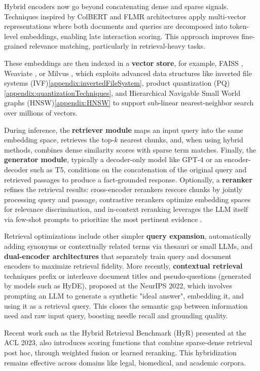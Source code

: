 \documentclass[12pt,twoside]{report}
\begin{document}
Hybrid encoders now go beyond concatenating dense and sparse signals. Techniques inspired by ColBERT and FLMR architectures apply multi-vector representations where both documents and queries are decomposed into token-level embeddings, enabling late interaction scoring\cite{ColBERT}. This approach improves fine-grained relevance matching, particularly in retrieval-heavy tasks.

These embeddings are then indexed in a \textbf{vector store}, for example, FAISS \cite{FAISS}, Weaviate \cite{Weaviate}, or Milvus \cite{Milvus}, which exploits advanced data structures like inverted file systems (IVF)\ref{appendix:invertedFileSystem}, product quantization (PQ)\ref{appendix:quantizationTechniques}, and Hierarchical Navigable Small World graphs (HNSW)\ref{appendix:HNSW} to support sub-linear nearest-neighbor search over millions of vectors.

During inference, the \textbf{retriever module} maps an input query into the same embedding space, retrieves the top-$k$ nearest chunks, and, when using hybrid methods, combines dense similarity scores with sparse term matches. Finally, the \textbf{generator module}, typically a decoder-only model like GPT-4 or an encoder-decoder such as T5, conditions on the concatenation of the original query and retrieved passages to produce a fact-grounded response. Optionally, a \textbf{reranker} refines the retrieval results: cross-encoder rerankers rescore chunks by jointly processing query and passage, contrastive rerankers optimize embedding spaces for relevance discrimination, and in-context reranking leverages the LLM itself via few-shot prompts to prioritize the most pertinent evidence \cite{Reranking}.

Retrieval optimizations include other simpler \textbf{query expansion}, automatically adding synonyms or contextually related terms via thesauri or small LLMs, and \textbf{dual-encoder architectures} that separately train query and document encoders to maximize retrieval fidelity. More recently, \textbf{contextual retrieval} techniques prefix or interleave document titles and pseudo-questions (generated by models such as HyDE), proposed at the NeurIPS 2022\cite{HyDE}, which involves prompting an LLM to generate a synthetic "ideal answer", embedding it, and using it as a retrieval query. This closes the semantic gap between information need and raw input query, boosting needle recall and grounding quality.

Recent work such as the Hybrid Retrieval Benchmark (HyR\cite{HyR}) presented at the ACL 2023, also introduces scoring functions that combine sparse-dense retrieval post hoc, through weighted fusion or learned reranking\cite{HYRR}. This hybridization remains effective across domains like legal, biomedical, and academic corpora.
\end{document}
